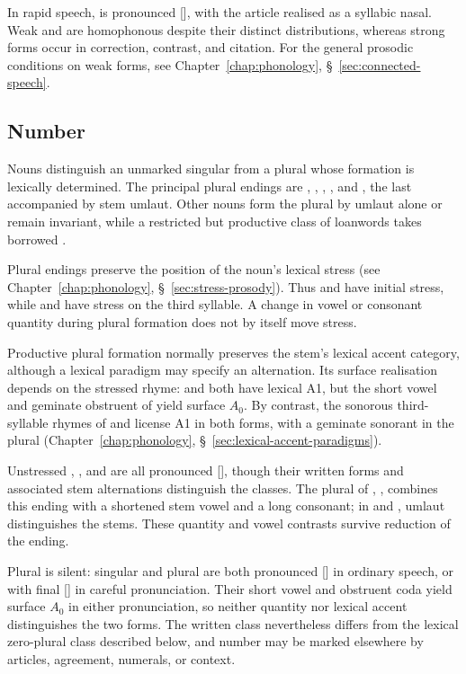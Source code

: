 In rapid speech,  is pronounced [], with the article realised as a syllabic nasal. Weak  and  are homophonous despite their distinct distributions, whereas strong forms occur in correction, contrast, and citation. For the general prosodic conditions on weak forms, see Chapter~\ref{chap:phonology}, \S~\ref{sec:connected-speech}.

\subsection{Number}
\label{sec:nominal-number}

Nouns distinguish an unmarked singular from a plural whose formation is lexically determined. The principal plural endings are , , , , and , the last accompanied by stem umlaut. Other nouns form the plural by umlaut alone or remain invariant, while a restricted but productive class of loanwords takes borrowed .

Plural endings preserve the position of the noun's lexical stress (see Chapter~\ref{chap:phonology}, \S~\ref{sec:stress-prosody}). Thus  and  have initial stress, while  and  have stress on the third syllable. A change in vowel or consonant quantity during plural formation does not by itself move stress.

Productive plural formation normally preserves the stem's lexical accent category, although a lexical paradigm may specify an alternation. Its surface realisation depends on the stressed rhyme:  and  both have lexical A1, but the short vowel and geminate obstruent of  yield surface $A_0$. By contrast, the sonorous third-syllable rhymes of  and  license A1 in both forms, with a geminate sonorant in the plural (Chapter~\ref{chap:phonology}, \S~\ref{sec:lexical-accent-paradigms}).

Unstressed , , and  are all pronounced [], though their written forms and associated stem alternations distinguish the classes. The plural of , , combines this ending with a shortened stem vowel and a long consonant; in  and , umlaut distinguishes the stems. These quantity and vowel contrasts survive reduction of the ending.

Plural  is silent: singular  and plural  are both pronounced [] in ordinary speech, or with final [] in careful pronunciation. Their short vowel and obstruent coda yield surface $A_0$ in either pronunciation, so neither quantity nor lexical accent distinguishes the two forms. The written  class nevertheless differs from the lexical zero-plural class described below, and number may be marked elsewhere by articles, agreement, numerals, or context.

